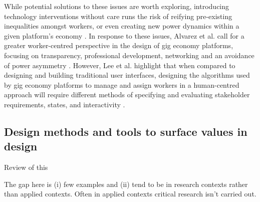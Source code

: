 While potential solutions to these issues are worth exploring, introducing technology interventions without care runs the risk of reifying pre-existing inequalities amongst workers, or even creating new power dynamics within a given platform's economy \cite{martin2016}. In response to these issues, Alvarez et al. call for a greater worker-centred perspective in the design of gig economy platforms, focusing on transparency, professional development, networking and an avoidance of power asymmetry \cite{carlos2021}. However, Lee et al. highlight that when compared to designing and building traditional user interfaces, designing the algorithms used by gig economy platforms to manage and assign workers in a human-centred approach will require different methods of specifying and evaluating stakeholder requirements, states, and interactivity \cite{lee2015}.


\subsection{Design methods and tools to surface values in design }

Review of this

The gap here is (i) few examples and (ii) tend to be in research contexts rather than applied contexts. Often in applied contexts critical research isn’t carried out. 
